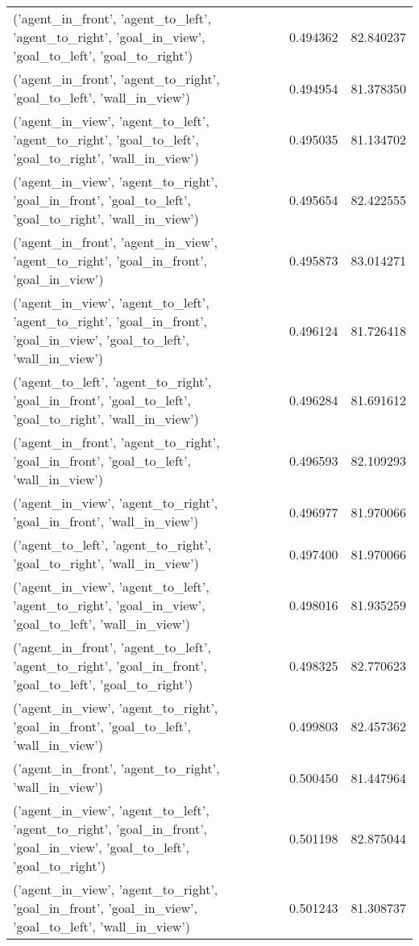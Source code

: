 \begin{tabular}{lrr}
('agent\_in\_front', 'agent\_to\_left', 'agent\_to\_right', 'goal\_in\_view', 'goal\_to\_left', 'goal\_to\_right') & 0.494362 & 82.840237 \\
('agent\_in\_front', 'agent\_to\_right', 'goal\_to\_left', 'wall\_in\_view') & 0.494954 & 81.378350 \\
('agent\_in\_view', 'agent\_to\_left', 'agent\_to\_right', 'goal\_to\_left', 'goal\_to\_right', 'wall\_in\_view') & 0.495035 & 81.134702 \\
('agent\_in\_view', 'agent\_to\_right', 'goal\_in\_front', 'goal\_to\_left', 'goal\_to\_right', 'wall\_in\_view') & 0.495654 & 82.422555 \\
('agent\_in\_front', 'agent\_in\_view', 'agent\_to\_right', 'goal\_in\_front', 'goal\_in\_view') & 0.495873 & 83.014271 \\
('agent\_in\_view', 'agent\_to\_left', 'agent\_to\_right', 'goal\_in\_front', 'goal\_in\_view', 'goal\_to\_left', 'wall\_in\_view') & 0.496124 & 81.726418 \\
('agent\_to\_left', 'agent\_to\_right', 'goal\_in\_front', 'goal\_to\_left', 'goal\_to\_right', 'wall\_in\_view') & 0.496284 & 81.691612 \\
('agent\_in\_front', 'agent\_to\_right', 'goal\_in\_front', 'goal\_to\_left', 'wall\_in\_view') & 0.496593 & 82.109293 \\
('agent\_in\_view', 'agent\_to\_right', 'goal\_in\_front', 'wall\_in\_view') & 0.496977 & 81.970066 \\
('agent\_to\_left', 'agent\_to\_right', 'goal\_to\_right', 'wall\_in\_view') & 0.497400 & 81.970066 \\
('agent\_in\_view', 'agent\_to\_left', 'agent\_to\_right', 'goal\_in\_view', 'goal\_to\_left', 'wall\_in\_view') & 0.498016 & 81.935259 \\
('agent\_in\_front', 'agent\_to\_left', 'agent\_to\_right', 'goal\_in\_front', 'goal\_to\_left', 'goal\_to\_right') & 0.498325 & 82.770623 \\
('agent\_in\_view', 'agent\_to\_right', 'goal\_in\_front', 'goal\_to\_left', 'wall\_in\_view') & 0.499803 & 82.457362 \\
('agent\_in\_front', 'agent\_to\_right', 'wall\_in\_view') & 0.500450 & 81.447964 \\
('agent\_in\_view', 'agent\_to\_left', 'agent\_to\_right', 'goal\_in\_front', 'goal\_in\_view', 'goal\_to\_left', 'goal\_to\_right') & 0.501198 & 82.875044 \\
('agent\_in\_view', 'agent\_to\_right', 'goal\_in\_front', 'goal\_in\_view', 'goal\_to\_left', 'wall\_in\_view') & 0.501243 & 81.308737 \\

\end{tabular}
